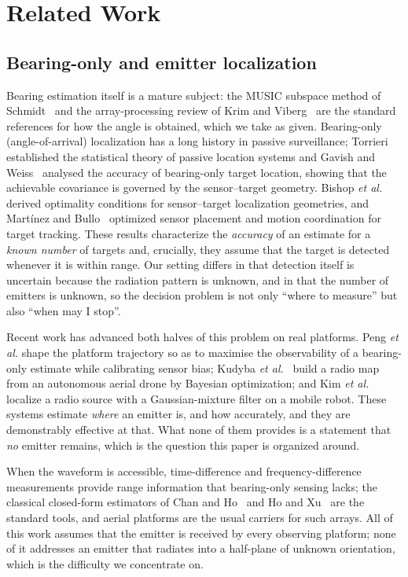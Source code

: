 \documentclass[preprint,12pt,3p]{elsarticle}
\theoremstyle{definition}
\begin{document}
\section{Related Work}

\subsection{Bearing-only and emitter localization}
Bearing estimation itself is a mature subject: the MUSIC subspace method of
Schmidt~\cite{schmidt1986} and the array-processing review of Krim and
Viberg~\cite{krim1996} are the standard references for how the angle is obtained, which we take as
given. Bearing-only (angle-of-arrival) localization has a long history in passive surveillance;
Torrieri~\cite{torrieri1984} established the statistical theory of passive location systems and
Gavish and Weiss~\cite{gavish1992} analysed the accuracy of bearing-only target location, showing
that the achievable covariance is governed by the sensor--target geometry. Bishop
\emph{et al.}~\cite{bishop2010} derived optimality conditions for sensor--target localization
geometries, and Mart\'inez and Bullo~\cite{martinez2006} optimized sensor placement and motion
coordination for target tracking. These results characterize the \emph{accuracy} of an estimate
for a \emph{known number} of targets and, crucially, they assume that the target is detected
whenever it is within range. Our setting differs in that detection itself is uncertain because
the radiation pattern is unknown, and in that the number of emitters is unknown, so the decision
problem is not only ``where to measure'' but also ``when may I stop''.

Recent work has advanced both halves of this problem on real platforms. Peng \emph{et al.}
\cite{peng2024} shape the platform trajectory so as to maximise the observability of a
bearing-only estimate while calibrating sensor bias; Kudyba \emph{et al.}~\cite{kudyba2024}
build a radio map from an autonomous aerial drone by Bayesian optimization; and Kim
\emph{et al.}~\cite{kim2025} localize a radio source with a Gaussian-mixture filter on a
mobile robot. These systems estimate \emph{where} an emitter is, and how accurately, and they
are demonstrably effective at that. What none of them provides is a statement that \emph{no}
emitter remains, which is the question this paper is organized around.

When the waveform is accessible, time-difference and frequency-difference measurements provide
range information that bearing-only sensing lacks; the classical closed-form estimators of
Chan and Ho~\cite{chan1994} and Ho and Xu~\cite{ho2004} are the standard tools, and
aerial platforms are the usual carriers for such arrays. All of this work assumes that the
emitter is received by every observing platform; none of it addresses an emitter that radiates
into a half-plane of unknown orientation, which is the difficulty we concentrate on.
\end{document}
